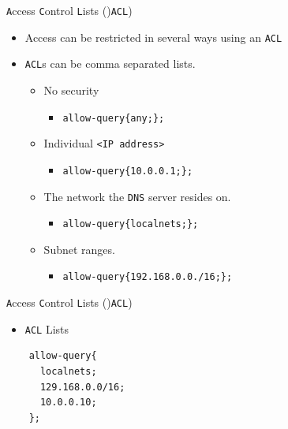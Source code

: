 \documentclass[xcolor=table]{beamer}
\begin{document}
\begin{frame}{\texttt{A}ccess \texttt{C}ontrol \texttt{L}ists ()\texttt{ACL})}
  \begin{itemize}
    \item Access can be restricted in several ways using an \texttt{ACL}
    \item \texttt{ACL}s can be comma separated lists.
      \begin{itemize}
        \item No security
          \begin{itemize}
            \item \texttt{allow-query\{any;\};}
          \end{itemize}
        \item Individual \texttt{<IP address>}
          \begin{itemize}
            \item \texttt{allow-query\{10.0.0.1;\};}
          \end{itemize}
        \item The network the \texttt{DNS} server resides on.
          \begin{itemize}
            \item \texttt{allow-query\{localnets;\};}
          \end{itemize}
        \item Subnet ranges.
          \begin{itemize}
            \item \texttt{allow-query\{192.168.0.0./16;\};}
          \end{itemize}
        \end{itemize}
  \end{itemize}
\end{frame}

\begin{frame}[fragile]{\texttt{A}ccess \texttt{C}ontrol \texttt{L}ists ()\texttt{ACL})}
  \begin{itemize}
    \item \texttt{ACL} Lists
  \end{itemize}
  \lstset{
    basicstyle=\small\ttfamily,
  }
  \begin{lstlisting}
    allow-query{
      localnets;
      129.168.0.0/16;
      10.0.0.10;
    };
  \end{lstlisting}
\end{frame}
\end{document}
